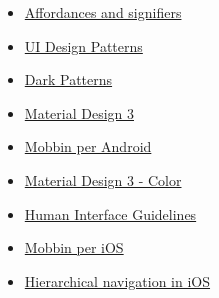 \begin{itemize}
    \item \href{https://medium.com/@h_locke/affordances-and-signifiers-82bd6f50fc1a}{Affordances and signifiers}
    \item \href{https://ui-patterns.com/patterns}{UI Design Patterns}
    \item \href{https://www.deceptive.design/}{Dark Patterns}
    \item \href{https://m3.material.io/}{Material Design 3}
    \item \href{https://mobbin.com/browse/android/apps}{Mobbin per Android}
    \item \href{https://m3.material.io/styles/color/system/overview}{Material Design 3 - Color}
    \item \href{https://developer.apple.com/design/human-interface-guidelines}{Human Interface Guidelines}
    \item \href{https://mobbin.com/browse/ios/apps}{Mobbin per iOS}
    \item \href{https://developer.apple.com/videos/play/wwdc2022/10001}{Hierarchical navigation in iOS}
\end{itemize}

